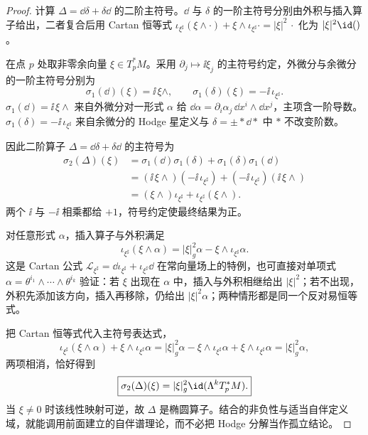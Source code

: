 \begin{proof}
计算 $\Delta=\dd\delta+\delta\dd$ 的二阶主符号。$\dd$ 与 $\delta$ 的一阶主符号分别由外积与插入算子给出，二者复合后用 Cartan 恒等式 $\iota_{\xi^\sharp}(\xi\wedge\cdot)+\xi\wedge\iota_{\xi^\sharp}\cdot=|\xi|^2\,\cdot$ 化为 $|\xi|^2\id()$。

在点 $p$ 处取非零余向量 $\xi\in T_p^*M$。采用 $\partial_j\mapsto \ii\xi_j$ 的主符号约定，外微分与余微分的一阶主符号分别为
\begin{equation*}
\sigma_1(\dd)(\xi)=\ii\,\xi\wedge,
\qquad
\sigma_1(\delta)(\xi)=-\ii\,\iota_{\xi^\sharp}.
\end{equation*}
$\sigma_1(\dd)=\ii\,\xi\wedge$ 来自外微分对一形式 $\alpha$ 给 $\dd\alpha=\partial_i\alpha_j\,\dd x^i\wedge\dd x^j$，主项含一阶导数。$\sigma_1(\delta)=-\ii\,\iota_{\xi^\sharp}$ 来自余微分的 Hodge 星定义与 $\delta=\pm *\dd*$ 中 $*$ 不改变阶数。

因此二阶算子 $\Delta=\dd\delta+\delta\dd$ 的主符号为
\begin{equation*}
\begin{aligned}
\sigma_2(\Delta)(\xi)
&=\sigma_1(\dd)\sigma_1(\delta)+\sigma_1(\delta)\sigma_1(\dd)\\
&=(\ii\,\xi\wedge)(-\ii\,\iota_{\xi^\sharp})
+(-\ii\,\iota_{\xi^\sharp})(\ii\,\xi\wedge)\\
&=(\xi\wedge)\iota_{\xi^\sharp}
+\iota_{\xi^\sharp}(\xi\wedge).
\end{aligned}
\end{equation*}
两个 $\ii$ 与 $-\ii$ 相乘都给 $+1$，符号约定使最终结果为正。

对任意形式 $\alpha$，插入算子与外积满足
\begin{equation*}
\iota_{\xi^\sharp}(\xi\wedge\alpha)
=|\xi|_g^2\alpha
-\xi\wedge\iota_{\xi^\sharp}\alpha.
\end{equation*}
这是 Cartan 公式 $\mathcal L_{\xi^\sharp}=\dd\iota_{\xi^\sharp}+\iota_{\xi^\sharp}\dd$ 在常向量场上的特例，也可直接对单项式 $\alpha=\theta^{i_1}\wedge\cdots\wedge\theta^{i_k}$ 验证：若 $\xi$ 出现在 $\alpha$ 中，插入与外积相继给出 $|\xi|^2$；若不出现，外积先添加该方向，插入再移除，仍给出 $|\xi|^2\alpha$；两种情形都是同一个反对易恒等式。

把 Cartan 恒等式代入主符号表达式，
\begin{equation*}
\iota_{\xi^\sharp}(\xi\wedge\alpha)
+\xi\wedge\iota_{\xi^\sharp}\alpha
=|\xi|_g^2\alpha
-\xi\wedge\iota_{\xi^\sharp}\alpha
+\xi\wedge\iota_{\xi^\sharp}\alpha
=|\xi|_g^2\alpha,
\end{equation*}
两项相消，恰好得到
\begin{equation}\label{eq:math-dg-hodge-principal-symbol}
\boxed{
\sigma_2(\Delta)(\xi)
=|\xi|_g^2\id(\Lambda^kT_p^*M).}
\end{equation}
当 $\xi\neq0$ 时该线性映射可逆，故 $\Delta$ 是椭圆算子。结合的非负性与适当自伴定义域，就能调用前面建立的自伴谱理论，而不必把 Hodge 分解当作孤立结论。


\end{proof}
